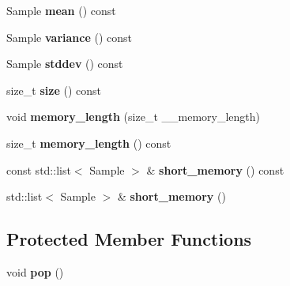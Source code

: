 \begin{DoxyCompactItemize}
Sample {\bfseries mean} () const
\item 
\hypertarget{classskl_1_1_short_memory_moments_a6e5c15f9794e48975eb3e73789413a14}{}\label{classskl_1_1_short_memory_moments_a6e5c15f9794e48975eb3e73789413a14} 
Sample {\bfseries variance} () const
\item 
\hypertarget{classskl_1_1_short_memory_moments_aab5a76ac31752abf4bc0b2f98518bed0}{}\label{classskl_1_1_short_memory_moments_aab5a76ac31752abf4bc0b2f98518bed0} 
Sample {\bfseries stddev} () const
\item 
\hypertarget{classskl_1_1_short_memory_moments_a4002576cceb297b0a99754ce5154fc92}{}\label{classskl_1_1_short_memory_moments_a4002576cceb297b0a99754ce5154fc92} 
size\+\_\+t {\bfseries size} () const
\item 
\hypertarget{classskl_1_1_short_memory_moments_a30182a68815880321af4ab3001711f62}{}\label{classskl_1_1_short_memory_moments_a30182a68815880321af4ab3001711f62} 
void {\bfseries memory\+\_\+length} (size\+\_\+t \+\_\+\+\_\+memory\+\_\+length)
\item 
\hypertarget{classskl_1_1_short_memory_moments_a524b3def4dc523479423fd574d8c7c69}{}\label{classskl_1_1_short_memory_moments_a524b3def4dc523479423fd574d8c7c69} 
size\+\_\+t {\bfseries memory\+\_\+length} () const
\item 
\hypertarget{classskl_1_1_short_memory_moments_a68ce6b75f502bbe9cfa2cc61a3c2f533}{}\label{classskl_1_1_short_memory_moments_a68ce6b75f502bbe9cfa2cc61a3c2f533} 
const std\+::list$<$ Sample $>$ \& {\bfseries short\+\_\+memory} () const
\item 
\hypertarget{classskl_1_1_short_memory_moments_accb65fb4409f56d1a2d8849038ba700c}{}\label{classskl_1_1_short_memory_moments_accb65fb4409f56d1a2d8849038ba700c} 
std\+::list$<$ Sample $>$ \& {\bfseries short\+\_\+memory} ()
\end{DoxyCompactItemize}
\subsection*{Protected Member Functions}
\begin{DoxyCompactItemize}
\item 
\hypertarget{classskl_1_1_short_memory_moments_a7ecfa55b2e215c8920c4ac3b5771ac6d}{}\label{classskl_1_1_short_memory_moments_a7ecfa55b2e215c8920c4ac3b5771ac6d} 
void {\bfseries pop} ()
\end{DoxyCompactItemize}
